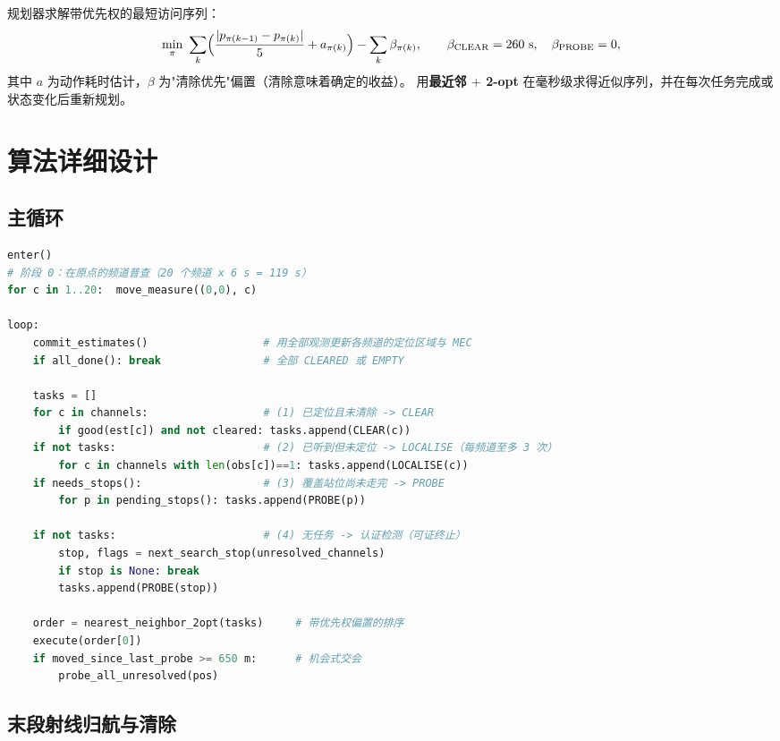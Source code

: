 规划器求解带优先权的最短访问序列：
\begin{equation}
\min_{\pi}\ \sum_{k}\Bigl(\frac{|p_{\pi(k-1)}-p_{\pi(k)}|}{5}+a_{\pi(k)}\Bigr)-\sum_{k}\beta_{\pi(k)},
\qquad \beta_{\text{CLEAR}}=260\ \text{s},\quad \beta_{\text{PROBE}}=0,
\end{equation}
其中 $a$ 为动作耗时估计，$\beta$ 为"清除优先"偏置（清除意味着确定的收益）。
用\textbf{最近邻 $+$ 2-opt} 在毫秒级求得近似序列，并在每次任务完成或状态变化后重新规划。

\section{算法详细设计}

\subsection{主循环}

\begin{lstlisting}[language=Python,caption={问题三主算法（对应 robot\_core.Brain.run）}]
enter()
# 阶段 0：在原点的频道普查（20 个频道 x 6 s = 119 s）
for c in 1..20:  move_measure((0,0), c)

loop:
    commit_estimates()                  # 用全部观测更新各频道的定位区域与 MEC
    if all_done(): break                # 全部 CLEARED 或 EMPTY

    tasks = []
    for c in channels:                  # (1) 已定位且未清除 -> CLEAR
        if good(est[c]) and not cleared: tasks.append(CLEAR(c))
    if not tasks:                       # (2) 已听到但未定位 -> LOCALISE（每频道至多 3 次）
        for c in channels with len(obs[c])==1: tasks.append(LOCALISE(c))
    if needs_stops():                   # (3) 覆盖站位尚未走完 -> PROBE
        for p in pending_stops(): tasks.append(PROBE(p))

    if not tasks:                       # (4) 无任务 -> 认证检测（可证终止）
        stop, flags = next_search_stop(unresolved_channels)
        if stop is None: break
        tasks.append(PROBE(stop))

    order = nearest_neighbor_2opt(tasks)     # 带优先权偏置的排序
    execute(order[0])
    if moved_since_last_probe >= 650 m:      # 机会式交会
        probe_all_unresolved(pos)
\end{lstlisting}

\subsection{末段射线归航与清除}


